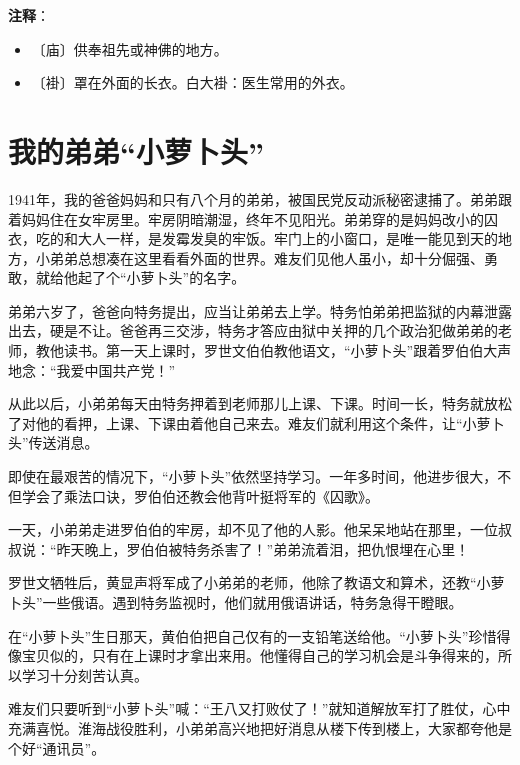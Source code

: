 \documentclass[12pt,UTF-8,openany]{ctexbook}
\begin{document}
\textbf{注释}：

\vspace{-1em}

\begin{itemize}
    \setlength\itemsep{-0.2em}
    \item 〔庙〕供奉祖先或神佛的地方。
    \item 〔褂〕罩在外面的长衣。白大褂：医生常用的外衣。
\end{itemize}

\chapter{我的弟弟“小萝卜头”}

\begin{large}
    
    1941年，我的爸爸妈妈和只有八个月的弟弟，被国民党反动派秘密逮捕了。弟弟跟着妈妈住在女牢房里。牢房阴暗潮湿，终年不见阳光。弟弟穿的是妈妈改小的囚衣，吃的和大人一样，是发霉发臭的牢饭。牢门上的小窗口，是唯一能见到天的地方，小弟弟总想凑在这里看看外面的世界。难友们见他人虽小，却十分倔强、勇敢，就给他起了个“小萝卜头”的名字。
    
    弟弟六岁了，爸爸向特务提出，应当让弟弟去上学。特务怕弟弟把监狱的内幕泄露出去，硬是不让。爸爸再三交涉，特务才答应由狱中关押的几个政治犯做弟弟的老师，教他读书。第一天上课时，罗世文伯伯教他语文，“小萝卜头”跟着罗伯伯大声地念：“我爱中国共产党！”
    
    从此以后，小弟弟每天由特务押着到老师那儿上课、下课。时间一长，特务就放松了对他的看押，上课、下课由着他自己来去。难友们就利用这个条件，让“小萝卜头”传送消息。
    
    即使在最艰苦的情况下，“小萝卜头”依然坚持学习。一年多时间，他进步很大，不但学会了乘法口诀，罗伯伯还教会他背叶挺将军的《囚歌》。
    
    一天，小弟弟走进罗伯伯的牢房，却不见了他的人影。他呆呆地站在那里，一位叔叔说：“昨天晚上，罗伯伯被特务杀害了！”弟弟流着泪，把仇恨埋在心里！
    
    罗世文牺牲后，黄显声将军成了小弟弟的老师，他除了教语文和算术，还教“小萝卜头”一些俄语。遇到特务监视时，他们就用俄语讲话，特务急得干瞪眼。
    
    在“小萝卜头”生日那天，黄伯伯把自己仅有的一支铅笔送给他。“小萝卜头”珍惜得像宝贝似的，只有在上课时才拿出来用。他懂得自己的学习机会是斗争得来的，所以学习十分刻苦认真。
    
    难友们只要听到“小萝卜头”喊：“王八又打败仗了！”就知道解放军打了胜仗，心中充满喜悦。淮海战役胜利，小弟弟高兴地把好消息从楼下传到楼上，大家都夸他是个好“通讯员”。
    
\end{large}
\end{document}
